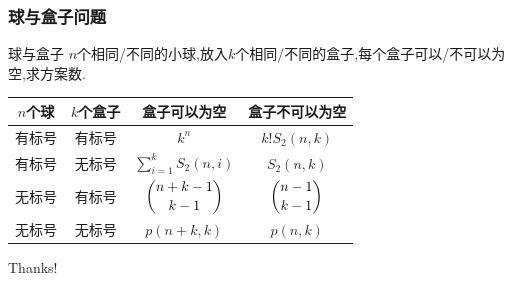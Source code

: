 \documentclass{beamer}
\newcommand{\pau}{}
\begin{document}
\begin{frame}[fragile]
    \frametitle{球与盒子问题}
    \begin{block}{球与盒子}
        $n$个相同/不同的小球,放入$k$个相同/不同的盒子,每个盒子可以/不可以为空,求方案数.
    \end{block}\pau
    \begin{center}
   		\begin{tabular}{cc|cc}\hline
   			$n$个球&$k$个盒子&盒子可以为空&盒子不可以为空\\\hline
   			有标号&有标号&$k^n$&$k!S_2\left(n,k\right)$\\
   			有标号&无标号&$\sum\limits_{i=1}^kS_2\left(n,i\right)$&$S_2\left(n,k\right)$\\
   			无标号&有标号&$\dbinom{n+k-1}{k-1}$&$\dbinom{n-1}{k-1}$\\
   			无标号&无标号&$p\left(n+k,k\right)$&$p\left(n,k\right)$\\\hline			
   		\end{tabular}
   	\end{center}
\end{frame}

\begin{frame}
    \begin{center}
        {\Huge\calligra Thanks!}
    \end{center}
\end{frame}
\end{document}
